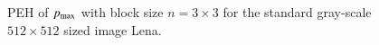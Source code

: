 \documentclass[review,3p,10pt,sort&compress]{elsarticle}
\begin{document}
\begin{figure}
{\begin{minipage}[t]{0.32\linewidth}
    \end{minipage}
}
\qquad\qquad
{}		
\centering
\caption{PEH of $p_{\rm max}$ with block size $n = 3 \times 3$ for the standard gray-scale $512 \times 512$ sized image Lena.}
\label{Fig.PVOIPVO}
\end{figure}
\end{document}
